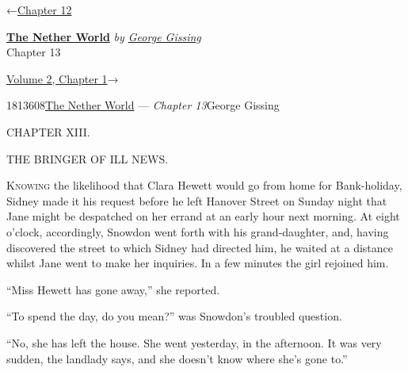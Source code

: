 \hypertarget{headerContainer}{}
\hypertarget{navigationHeader}{}
\protect\hypertarget{headerprevious}{}{←\href{/wiki/The_Nether_World/Volume_1/Chapter_12}{Chapter
12}}

\textbf{\protect\hypertarget{header_title_text}{}{\href{/wiki/The_Nether_World}{The
Nether World}}} \emph{by
\href{/wiki/Author:George_Gissing}{\protect\hypertarget{header_author_text}{}{{George
Gissing}}}}\\
\protect\hypertarget{header_section_text}{}{Chapter 13}

\protect\hypertarget{headernext}{}{\href{/wiki/The_Nether_World/Volume_2/Chapter_1}{Volume
2, Chapter 1}→}

\hypertarget{navigationNotes}{}

\hypertarget{ws-data}{}
\protect\hypertarget{ws-article-id}{}{1813608}\protect\hypertarget{ws-title}{}{\href{/wiki/The_Nether_World}{The
Nether World} --- \emph{Chapter
13}}\protect\hypertarget{ws-author}{}{George Gissing}

{\protect\hypertarget{276}{}{}}

{CHAPTER XIII.}

THE BRINGER OF ILL NEWS.

\textsc{Knowing} the likelihood that Clara Hewett would go from home for
Bank-holiday, Sidney made it his request before he left Hanover Street
on Sunday night that Jane might be despatched on her errand at an early
hour next morning. At eight o'clock, accordingly, Snowdon went forth
with his grand-daughter, and, having discovered the street to which
Sidney had directed him, he waited at a distance whilst Jane went to
make her inquiries. In a few minutes the girl rejoined him.

``Miss Hewett has gone away,'' she reported.

``To spend the day, do you mean?'' was Snowdon's troubled question.

``No, she has left the house. She went yesterday, in the afternoon. It
was very {\protect\hypertarget{277}{}{}}sudden, the landlady says, and
she doesn't know where she's gone to.''

